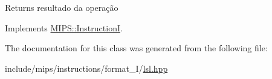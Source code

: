 \begin{DoxyReturn}{Returns}
resultado da operação 
\end{DoxyReturn}


Implements \hyperlink{classMIPS_1_1InstructionI_ae60fca5801bf5415cdff06d2aa11764f}{M\+I\+P\+S\+::\+InstructionI}.



The documentation for this class was generated from the following file\+:\begin{DoxyCompactItemize}
\item 
include/mips/instructions/format\+\_\+\+I/\hyperlink{lsl_8hpp}{lsl.\+hpp}\end{DoxyCompactItemize}
